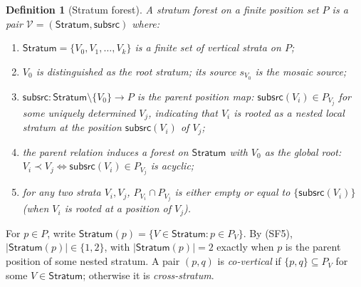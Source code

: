 \documentclass[11pt]{article}
\newtheorem{definition}[theorem]{Definition}
\newcommand{\Stratum}{\mathsf{Stratum}}
\newcommand{\Subsrc}{\mathsf{subsrc}}
\begin{document}
\begin{definition}[Stratum forest]\label{def:stratum-forest}
A \emph{stratum forest} on a finite position set $P$ is a pair
$\mathcal V=(\Stratum,\Subsrc)$ where:
\begin{enumerate}[label=(SF\arabic*)]
\item $\Stratum=\{V_0,V_1,\dots,V_k\}$ is a finite set of vertical
  strata on $P$;
\item $V_0$ is distinguished as the \emph{root stratum}; its source
  $s_{V_0}$ is the \emph{mosaic source};
\item $\Subsrc:\Stratum\setminus\{V_0\}\to P$ is the \emph{parent
  position map}: $\Subsrc(V_i)\in P_{V_j}$ for some uniquely
  determined $V_j$, indicating that $V_i$ is rooted as a nested
  local stratum at the position $\Subsrc(V_i)$ of $V_j$;
\item the parent relation induces a forest on $\Stratum$ with $V_0$
  as the global root: $V_i\prec V_j\iff\Subsrc(V_i)\in P_{V_j}$ is
  acyclic;
\item for any two strata $V_i,V_j$, $P_{V_i}\cap P_{V_j}$ is either
  empty or equal to $\{\Subsrc(V_i)\}$ (when $V_i$ is rooted at a
  position of $V_j$).
\end{enumerate}
\end{definition}

\noindent
For $p\in P$, write $\Stratum(p)=\{V\in\Stratum:p\in P_V\}$.  By
(SF5), $|\Stratum(p)|\in\{1,2\}$, with $|\Stratum(p)|=2$ exactly
when $p$ is the parent position of some nested stratum.  A pair
$(p,q)$ is \emph{co-vertical} if $\{p,q\}\subseteq P_V$ for some
$V\in\Stratum$; otherwise it is \emph{cross-stratum}.
\end{document}
